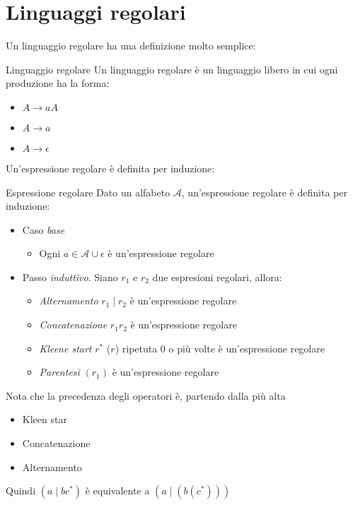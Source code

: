 \section{Linguaggi regolari}
Un linguaggio regolare ha una definizione molto semplice:
\begin{definizione}{Linguaggio regolare}
	Un linguaggio regolare è un linguaggio libero in cui ogni produzione ha la forma:
	\begin{itemize}
		\item $ A \rightarrow aA $
		\item $ A \rightarrow a $
		\item $ A \rightarrow \epsilon $
	\end{itemize}
\end{definizione}
Un'espressione regolare è definita per induzione:
\begin{definizione}{Espressione regolare}
	Dato un alfabeto $ \mathcal{A} $,  un'espressione regolare è definita per induzione:
	\begin{itemize}
		\item Caso \textit{base}
		      \begin{itemize}
			      \item Ogni $ a \in \mathcal{A} \cup \epsilon  $ è un'espressione regolare
		      \end{itemize}

		\item Passo \textit{induttivo}. Siano $ r_1 $ e $ r_2 $ due espresioni regolari, allora:
		      \begin{itemize}
			      \item \textit{Alternamento} $ r_1 \mid r_2 $ è un'espressione regolare
			      \item \textit{Concatenazione} $ r_1 r_2 $ è un'espressione regolare
			      \item \textit{Kleene start} $ r^{*} $ ($ r $) ripetuta 0 o più volte è un'espressione regolare
			      \item \textit{Parentesi} $ \left(r_1\right) $ è un'espressione regolare
		      \end{itemize}
	\end{itemize}
\end{definizione}
Nota che la precedenza degli operatori è, partendo dalla più alta
\begin{itemize}
	\item Kleen star
	\item Concatenazione
	\item Alternamento
\end{itemize}
Quindi $ \left(a \mid bc ^{*}\right) $ è equivalente a $ \left(a \mid \left(b \left(c^{*}\right)\right)\right) $
